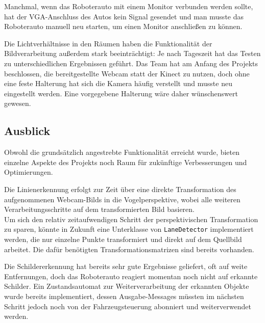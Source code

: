 Manchmal, wenn das Roboterauto mit einem Monitor verbunden werden sollte, hat der VGA-Anschluss des Autos kein Signal gesendet und man musste das Roboterauto manuell neu starten, um einen Monitor anschlie\ss{}en zu k\"onnen. 

Die Lichtverh\"altnisse in den R\"aumen haben die Funktionalit\"at der Bildverarbeitung au\ss erdem stark beeintr\"achtigt: 
Je nach Tageszeit hat das Testen zu unterschiedlichen Ergebnissen gef\"uhrt. 
Das Team hat am Anfang des Projekts beschlossen, die bereitgestellte Webcam statt der Kinect zu nutzen, 
doch ohne eine feste Halterung hat sich die Kamera h\"aufig verstellt und musste neu eingestellt werden. 
Eine vorgegebene Halterung w\"are daher w\"unschenswert gewesen.

\subsection{Ausblick}
Obwohl die grunds\"atzlich angestrebte Funktionalit\"at erreicht wurde, bieten einzelne
Aspekte des Projekts noch Raum f\"ur zuk\"unftige Verbesserungen und Optimierungen.

Die Linienerkennung erfolgt zur Zeit \"uber eine direkte Transformation des aufgenommenen
Webcam-Bilds in die Vogelperspektive, wobei alle weiteren Verarbeitungsschritte auf dem
transformierten Bild basieren.\\
Um sich den relativ zeitaufwendigen Schritt der perspektivischen Transformation zu sparen, k\"onnte
in Zukunft eine Unterklasse von \texttt{LaneDetector} implementiert werden, die
nur einzelne Punkte transformiert und direkt auf dem Quellbild arbeitet. Die daf\"ur
ben\"otigten Transformationsmatrizen sind bereits vorhanden.

Die Schildererkennung hat bereits sehr gute Ergebnisse geliefert, oft auf weite Entfernungen, doch das Roboterauto reagiert momentan noch nicht auf erkannte Schilder.
Ein Zustandsautomat zur Weiterverarbeitung der erkannten Objekte wurde bereits implementiert, dessen
Ausgabe-Messages m\"ussten im n\"achsten Schritt jedoch noch von der Fahrzeugsteuerung
abonniert und weiterverwendet werden.